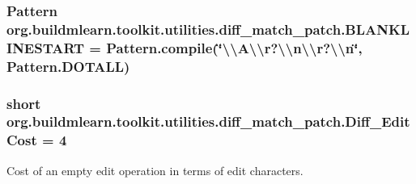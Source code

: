 \subsubsection[{\texorpdfstring{B\+L\+A\+N\+K\+L\+I\+N\+E\+S\+T\+A\+RT}{BLANKLINESTART}}]{\setlength{\rightskip}{0pt plus 5cm}Pattern org.\+buildmlearn.\+toolkit.\+utilities.\+diff\+\_\+match\+\_\+patch.\+B\+L\+A\+N\+K\+L\+I\+N\+E\+S\+T\+A\+RT = Pattern.\+compile(\char`\"{}\textbackslash{}\textbackslash{}A\textbackslash{}\textbackslash{}r?\textbackslash{}\textbackslash{}n\textbackslash{}\textbackslash{}r?\textbackslash{}\textbackslash{}n\char`\"{}, Pattern.\+D\+O\+T\+A\+LL)\hspace{0.3cm}{\ttfamily [private]}}\hypertarget{classorg_1_1buildmlearn_1_1toolkit_1_1utilities_1_1diff__match__patch_a8e0b9a30b90e431d81090b41a32ceaa1}{}\label{classorg_1_1buildmlearn_1_1toolkit_1_1utilities_1_1diff__match__patch_a8e0b9a30b90e431d81090b41a32ceaa1}
\subsubsection[{\texorpdfstring{Diff\+\_\+\+Edit\+Cost}{Diff_EditCost}}]{\setlength{\rightskip}{0pt plus 5cm}short org.\+buildmlearn.\+toolkit.\+utilities.\+diff\+\_\+match\+\_\+patch.\+Diff\+\_\+\+Edit\+Cost = 4}\hypertarget{classorg_1_1buildmlearn_1_1toolkit_1_1utilities_1_1diff__match__patch_ac0bccfcdfb920ae47c6da51095154ab6}{}\label{classorg_1_1buildmlearn_1_1toolkit_1_1utilities_1_1diff__match__patch_ac0bccfcdfb920ae47c6da51095154ab6}
Cost of an empty edit operation in terms of edit characters. 
